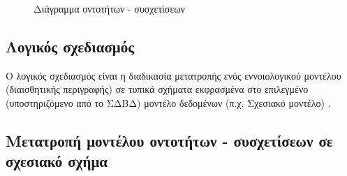 \documentclass{assignment}
\begin{document}
\begin{figure}
\begin{center}
\caption{Διάγραμμα οντοτήτων - συσχετίσεων}
\label{fig:ER:diagram}
\end{center}
\end{figure}


\subsection{Λογικός σχεδιασμός}

Ο λογικός σχεδιασμός είναι η διαδικασία μετατροπής ενός εννοιολογικού μοντέλου (διαισθητικής περιγραφής) σε τυπικά σχήματα εκφρασμένα στο επιλεγμένο (υποστηριζόμενο από το ΣΔΒΔ) μοντέλο δεδομένων (π.χ. Σχεσιακό μοντέλο) \cite{class_notes}.

\subsection{Μετατροπή μοντέλου οντοτήτων - συσχετίσεων σε σχεσιακό σχή\-μα}
\end{document}
